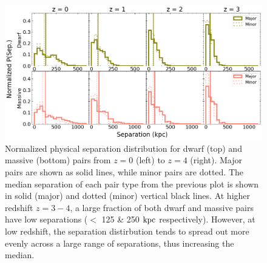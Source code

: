 \documentclass[twocolumn]{aastex631}
\newcommand{\kc}[1]{\textcolor{yellow}{\textbf{kc: #1}} }
\begin{document}
\begin{figure}[htb]
  \centering
  \includegraphics[width=\textwidth]{separation_distribution.png}
  \caption{Normalized physical separation distribution for dwarf (top) and massive (bottom) pairs from $z=0$ (left) to $z=4$ (right). Major pairs are shown as solid lines, while minor pairs are dotted. The median separation of each pair type from the previous plot is shown in solid (major) and dotted (minor) vertical black lines. 
  At higher redshift $z=3-4$, a large fraction of both dwarf and massive pairs have low separations ($<$ 125 \& 250 $\mathrm{kpc}$ respectively). However, at low redshift, the separation distirbution tends to spread out more evenly across a large range of separations, thus increasing the median.
    }
  \label{fig:sep-dist}
\end{figure}
\end{document}
